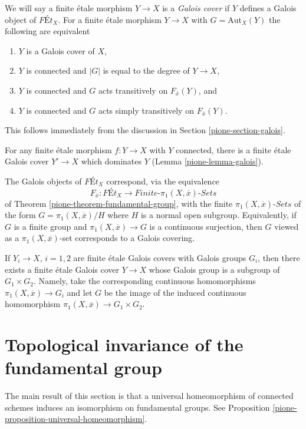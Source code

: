 \medskip\noindent
We will say a finite \'etale morphism $Y \to X$ is a
{\it Galois cover} if $Y$ defines a Galois object of
$\textit{F\'Et}_X$.
For a finite \'etale morphism $Y \to X$ with $G = \text{Aut}_X(Y)$
the following are equivalent
\begin{enumerate}
\item $Y$ is a Galois cover of $X$,
\item $Y$ is connected and $|G|$ is equal to the degree of $Y \to X$,
\item $Y$ is connected and $G$ acts transitively on $F_{\overline{x}}(Y)$, and
\item $Y$ is connected and $G$ acts simply transitively on
$F_{\overline{x}}(Y)$.
\end{enumerate}
This follows immediately from the discussion in Section \ref{pione-section-galois}.

\medskip\noindent
For any finite \'etale morphism $f : Y \to X$ with $Y$ connected,
there is a finite \'etale Galois cover $Y' \to X$ which dominates $Y$
(Lemma \ref{pione-lemma-galois}).

\medskip\noindent
The Galois objects of $\textit{F\'Et}_X$ correspond, via the equivalence
$$
F_{\overline{x}} : \textit{F\'Et}_X \to
\textit{Finite-}\pi_1(X, \overline{x})\textit{-Sets}
$$
of Theorem \ref{pione-theorem-fundamental-group},
with the finite $\pi_1(X, \overline{x})\textit{-Sets}$
of the form $G = \pi_1(X, \overline{x})/H$ where $H$ is a
normal open subgroup. Equivalently, if $G$ is a finite group
and $\pi_1(X, \overline{x}) \to G$ is a continuous surjection,
then $G$ viewed as a $\pi_1(X, \overline{x})$-set corresponds
to a Galois covering.

\medskip\noindent
If $Y_i \to X$, $i = 1, 2$ are finite \'etale Galois covers
with Galois groups $G_i$, then there exists a finite \'etale
Galois cover $Y \to X$ whose Galois group is a subgroup of
$G_1 \times G_2$. Namely, take the corresponding continuous
homomorphisms $\pi_1(X, \overline{x}) \to G_i$ and
let $G$ be the image of the induced continuous homomorphism
$\pi_1(X, \overline{x}) \to G_1 \times G_2$.

\section{Topological invariance of the fundamental group}
\label{pione-section-topological-invariance}
The main result of this section is that a universal homeomorphism
of connected schemes induces an isomorphism on fundamental groups.
See Proposition \ref{pione-proposition-universal-homeomorphism}.

